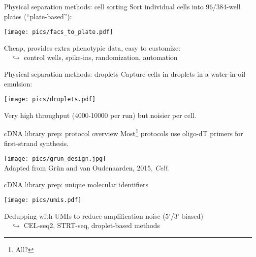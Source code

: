\documentclass{beamer}
\begin{document}
\begin{frame}{Physical separation methods: cell sorting}
Sort individual cells into 96/384-well plates (``plate-based''):

\begin{center}
\texttt{[image: pics/facs\_to\_plate.pdf]}
\end{center}

Cheap, provides extra phenotypic data, easy to customize:\\
$\quad\hookrightarrow$ control wells, spike-ins, randomization, automation
\end{frame}

\begin{frame}{Physical separation methods: droplets}
Capture cells in droplets in a water-in-oil emulsion:

\begin{center}
\texttt{[image: pics/droplets.pdf]}
\end{center}

Very high throughput (4000-10000 per run) but noisier per cell.
\end{frame}

\begin{frame}{cDNA library prep: protocol overview}
Most\footnote{All?} protocols use oligo-dT primers for first-strand synthesis.
\begin{center}
\texttt{[image: pics/grun\_design.jpg]} \\
{\tiny Adapted from Gr\"un and van Oudenaarden, 2015, \emph{Cell}.}
\end{center}
\end{frame}

\begin{frame}{cDNA library prep: unique molecular identifiers}
\begin{center}
\texttt{[image: pics/umis.pdf]}
\end{center}

Dedupping with UMIs to reduce amplification noise (5'/3' biased)\\
$\quad\hookrightarrow$ CEL-seq2, STRT-seq, droplet-based methods
\end{frame}
\end{document}
